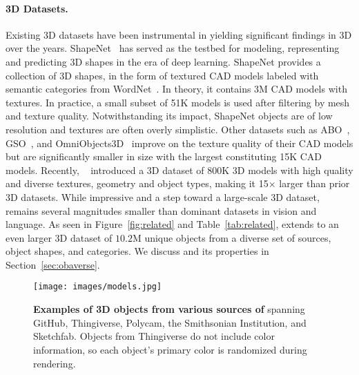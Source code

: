 \paragraph{3D Datasets.}
Existing 3D datasets have been instrumental in yielding significant findings in 3D over the years. 
ShapeNet~\cite{chang2015shapenet} has served as the testbed for modeling, representing and predicting 3D shapes in the era of deep learning. 
ShapeNet provides a collection of 3D shapes, in the form of textured CAD models labeled with semantic categories from WordNet~\cite{miller1995wordnet}. 
In theory, it contains 3M CAD models with textures. In practice, a small subset of 51K models is used after filtering by mesh and texture quality. 
Notwithstanding its impact, ShapeNet objects are of low resolution and textures are often overly simplistic.
Other datasets such as ABO~\cite{collins2022abo}, GSO~\cite{downs2022google}, and OmniObjects3D~\cite{wu2023omniobject3d} improve on the texture quality of their CAD models but are significantly smaller in size with the largest constituting 15K CAD models.
Recently, \datasetone~\cite{deitke2022objaverse} introduced a 3D dataset of 800K 3D models with high quality and diverse textures, geometry and object types, making it 15$\times$ larger than prior 3D datasets. 
While impressive and a step toward a large-scale 3D dataset, \datasetone remains several magnitudes smaller than dominant datasets in vision and language. 
As seen in Figure~\ref{fig:related} and Table~\ref{tab:related}, \dataset extends \datasetone to an even larger 3D dataset of $10.2$M unique objects from a diverse set of sources, object shapes, and categories. 
We discuss \dataset and its properties in Section~\ref{sec:obaverse}.

\begin{figure}
    \centering
    \texttt{[image: images/models.jpg]}
    \caption{\textbf{Examples of 3D objects from various sources of \dataset} spanning GitHub, Thingiverse, Polycam, the Smithsonian Institution, and Sketchfab. Objects from Thingiverse do not include color information, so each object's primary color is randomized during rendering.}
\end{figure}

